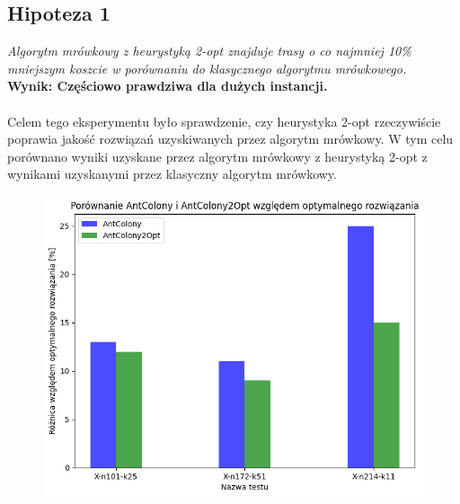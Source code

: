 \documentclass{article}
\begin{document}
\subsection{Hipoteza 1}
\textit{Algorytm mrówkowy z heurystyką 2-opt znajduje trasy o co najmniej 10\% mniejszym koszcie w porównaniu do klasycznego algorytmu mrówkowego.}
\\
\textbf{Wynik: Częściowo prawdziwa dla dużych instancji.} 
\\ \\
Celem tego eksperymentu było sprawdzenie, czy heurystyka 2-opt rzeczywiście poprawia jakość rozwiązań uzyskiwanych przez algorytm mrówkowy. W tym celu porównano wyniki uzyskane przez algorytm mrówkowy z heurystyką 2-opt z wynikami uzyskanymi przez klasyczny algorytm mrówkowy.


\begin{figure}[H]
    \centering
    \begin{minipage}{0.48\textwidth}
        \centering
        \caption{}
        \includegraphics[width=\linewidth]{img/2opt_wzgledem_optymalnego.png}
        \label{fig:2opt_wzgledem_optymalnego}
    \end{minipage}%
    \hfill
    \begin{minipage}{0.48\textwidth}
        \centering
        \caption{}

\end{minipage}
\end{figure}
\end{document}

